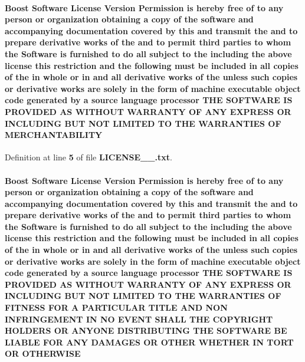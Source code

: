 \paragraph[{M\+E\+R\+C\+H\+A\+N\+T\+A\+B\+I\+L\+I\+TY}]{\setlength{\rightskip}{0pt plus 5cm}Boost {\bf Software} License Version Permission is hereby free of to any person or organization obtaining a copy of the software and accompanying documentation covered by this and transmit the and to prepare derivative works of the and to permit third parties to whom the {\bf Software} is furnished to do {\bf all} subject to the including the above {\bf license} this restriction and the {\bf following} must be included in {\bf all} copies of the in whole or in and {\bf all} derivative works of the unless such copies or derivative works are solely in the form of machine executable object code generated by a source language processor T\+HE S\+O\+F\+T\+W\+A\+RE {\bf IS} P\+R\+O\+V\+I\+D\+ED AS W\+I\+T\+H\+O\+UT W\+A\+R\+R\+A\+N\+TY OF A\+NY E\+X\+P\+R\+E\+SS OR I\+N\+C\+L\+U\+D\+I\+NG B\+UT N\+OT L\+I\+M\+I\+T\+ED TO T\+HE W\+A\+R\+R\+A\+N\+T\+I\+ES OF M\+E\+R\+C\+H\+A\+N\+T\+A\+B\+I\+L\+I\+TY}\label{LICENSE__1__0_8txt_a67f1603cd53689927b24e5d3cc8d757b}


Definition at line {\bf 5} of file {\bf L\+I\+C\+E\+N\+S\+E\+\_\+\_.\+txt}.

\paragraph[{O\+T\+H\+E\+R\+W\+I\+SE}]{\setlength{\rightskip}{0pt plus 5cm}Boost {\bf Software} License Version Permission is hereby free of to any person or organization obtaining a copy of the software and accompanying documentation covered by this and transmit the and to prepare derivative works of the and to permit third parties to whom the {\bf Software} is furnished to do {\bf all} subject to the including the above {\bf license} this restriction and the {\bf following} must be included in {\bf all} copies of the in whole or in and {\bf all} derivative works of the unless such copies or derivative works are solely in the form of machine executable object code generated by a source language processor T\+HE S\+O\+F\+T\+W\+A\+RE {\bf IS} P\+R\+O\+V\+I\+D\+ED AS W\+I\+T\+H\+O\+UT W\+A\+R\+R\+A\+N\+TY OF A\+NY E\+X\+P\+R\+E\+SS OR I\+N\+C\+L\+U\+D\+I\+NG B\+UT N\+OT L\+I\+M\+I\+T\+ED TO T\+HE W\+A\+R\+R\+A\+N\+T\+I\+ES OF F\+I\+T\+N\+E\+SS F\+OR A P\+A\+R\+T\+I\+C\+U\+L\+AR T\+I\+T\+LE A\+ND N\+ON I\+N\+F\+R\+I\+N\+G\+E\+M\+E\+NT IN NO E\+V\+E\+NT S\+H\+A\+LL T\+HE C\+O\+P\+Y\+R\+I\+G\+HT H\+O\+L\+D\+E\+RS OR A\+N\+Y\+O\+NE D\+I\+S\+T\+R\+I\+B\+U\+T\+I\+NG T\+HE S\+O\+F\+T\+W\+A\+RE BE L\+I\+A\+B\+LE F\+OR A\+NY D\+A\+M\+A\+G\+ES OR O\+T\+H\+ER W\+H\+E\+T\+H\+ER IN T\+O\+RT OR O\+T\+H\+E\+R\+W\+I\+SE}\label{LICENSE__1__0_8txt_ae54af06b740f9d21cc1b1937117baf62}


